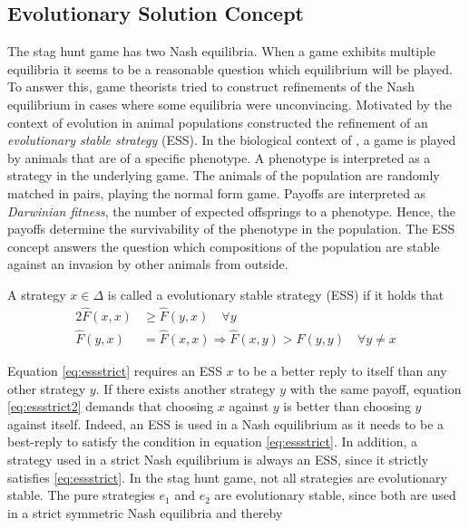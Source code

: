 \subsection{Evolutionary Solution Concept}
The stag hunt game has two Nash equilibria. When a game exhibits 
multiple equilibria it seems to be a reasonable question 
which equilibrium will be played. To answer this, 
game theorists tried to construct refinements 
of the Nash equilibrium in cases where some equilibria were unconvincing. 
Motivated by the context of evolution in animal populations 
\textcite{smith_lhe_1973} constructed the refinement of an 
\textit{evolutionary stable strategy} (ESS).  
In the biological context of \textcite{smith_lhe_1973}, a game is played 
by animals that are of a specific phenotype. A phenotype is interpreted
as a strategy in the underlying game. The animals of the population are randomly
matched in pairs, playing the normal form game. Payoffs are interpreted as
\textit{Darwinian fitness}, the number of expected offsprings to a phenotype.
Hence, the payoffs determine the survivability of the phenotype in the 
population.
The ESS concept answers the question which compositions of the population are
stable against an invasion by other animals from outside.
\begin{mydef}
        \label{def:ess}
        A strategy $x \in \Delta$ is called a evolutionary stable strategy 
        (ESS) if it holds that
        \begin{alignat}{2}
                \hat{F}(x,x) &\geq \hat{F}(y,x) \quad \forall y \label{eq:essstrict} \\
                \hat{F}(y,x) &= \hat{F}(x,x) \Rightarrow  
                \hat{F}(x,y) > \hat{F}(y,y) \quad \forall y \neq x \label{eq:essstrict2}
        \end{alignat}
\end{mydef}
Equation \eqref{eq:essstrict}
requires an ESS $x$ to be a better reply to itself than any other strategy $y$.
If there exists another strategy $y$ with the same payoff, equation 
\eqref{eq:essstrict2} demands that choosing $x$ against $y$ is better 
than choosing $y$ against itself.
Indeed, an ESS is used in a 
Nash equilibrium as it needs to be a best-reply to satisfy the 
condition in equation \eqref{eq:essstrict}. 
In addition, a strategy used in a strict 
Nash equilibrium is always an ESS, since it strictly satisfies 
\eqref{eq:essstrict}. 
In the stag hunt game, not all strategies are evolutionary stable.
The pure strategies $e_1$ and $e_2$ are evolutionary stable,
since both are used in a strict symmetric Nash equilibria and thereby 
